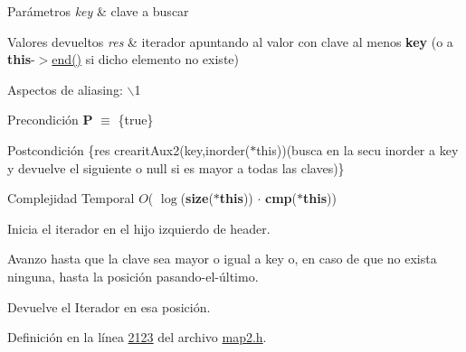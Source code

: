 \begin{DoxyParams}{\-Parámetros}
{\em key} & clave a buscar \\
\hline
\end{DoxyParams}

\begin{DoxyRetVals}{\-Valores devueltos}
{\em res} & iterador apuntando al valor con clave al menos {\bfseries key} (o a {\bfseries this}-\/$>$\hyperlink{classaed2_1_1iterator_a67caf9468be999e9be96b7add5d79946_a67caf9468be999e9be96b7add5d79946}{end()} si dicho elemento no existe)\\
\hline
\end{DoxyRetVals}
\begin{DoxyParagraph}{\-Aspectos de aliasing\-:}
$\backslash$1
\end{DoxyParagraph}
\begin{DoxyPrecond}{\-Precondición}
{\bfseries \-P} $\equiv$ \{true\} 
\end{DoxyPrecond}
\begin{DoxyPostcond}{\-Postcondición}
\{res  crearit\-Aux2(key,inorder($\ast$this))(busca en la secu inorder a key y devuelve el siguiente o null si es mayor a todas las claves)\}
\end{DoxyPostcond}

\begin{DoxyDescription}
\item[\-Complejidad \-Temporal]$O$( $\log$({\bfseries size}({\bfseries $\ast$this})) $\cdot$ {\bfseries cmp}({\bfseries $\ast$this}))
\end{DoxyDescription}
\begin{DoxyItemize}
\item \-Inicia el iterador en el hijo izquierdo de header.
\item \-Avanzo hasta que la clave sea mayor o igual a key o, en caso de que no exista ninguna, hasta la posición pasando-\/el-\/último.
\item \-Devuelve el \-Iterador en esa posición. 
\end{DoxyItemize}

\-Definición en la línea \hyperlink{map2_8h_source_l02123}{2123} del archivo \hyperlink{map2_8h_source}{map2.\-h}.

